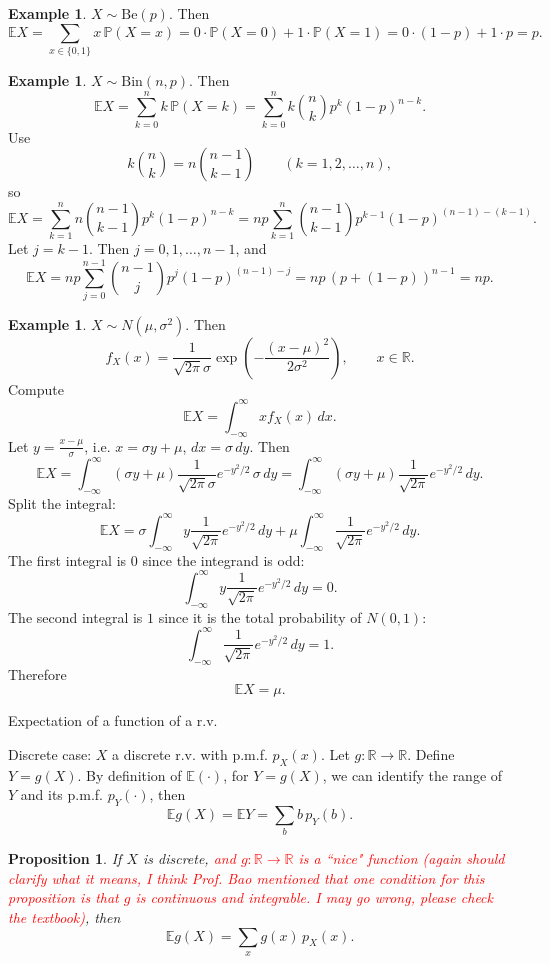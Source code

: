 \documentclass[11pt]{article}
\theoremstyle{plain}
\newtheorem{proposition}[theorem]{Proposition}
\theoremstyle{definition}
\newtheorem{example}[theorem]{Example}
\theoremstyle{remark}
\begin{document}
	\begin{example}
		\(X\sim \mathrm{Be}(p)\). Then
		\[
		\mathbb{E}X=\sum_{x\in\{0,1\}} x\,\mathbb{P}(X=x)
		=0\cdot\mathbb{P}(X=0)+1\cdot\mathbb{P}(X=1)
		=0\cdot(1-p)+1\cdot p
		=p.
		\]
	\end{example}
	
	\begin{example}
		\(X\sim \mathrm{Bin}(n,p)\). Then
		\[
		\mathbb{E}X=\sum_{k=0}^{n} k\,\mathbb{P}(X=k)
		=\sum_{k=0}^{n} k \binom{n}{k}p^k(1-p)^{n-k}.
		\]
		Use
		\[
		k\binom{n}{k}=n\binom{n-1}{k-1}\qquad (k=1,2,\dots,n),
		\]
		so
		\[
		\mathbb{E}X
		=\sum_{k=1}^{n} n\binom{n-1}{k-1}p^k(1-p)^{n-k}
		=np\sum_{k=1}^{n} \binom{n-1}{k-1}p^{k-1}(1-p)^{(n-1)-(k-1)}.
		\]
		Let \(j=k-1\). Then \(j=0,1,\dots,n-1\), and
		\[
		\mathbb{E}X
		=np\sum_{j=0}^{n-1} \binom{n-1}{j}p^{j}(1-p)^{(n-1)-j}
		=np\,(p+(1-p))^{n-1}
		=np.
		\]
	\end{example}
	
	\begin{example}
		\(X\sim N(\mu,\sigma^2)\). Then
		\[
		f_X(x)=\frac{1}{\sqrt{2\pi}\sigma}\exp\!\left(-\frac{(x-\mu)^2}{2\sigma^2}\right),
		\qquad x\in\mathbb{R}.
		\]
		Compute
		\[
		\mathbb{E}X=\int_{-\infty}^{\infty} x f_X(x)\,dx.
		\]
		Let \(y=\frac{x-\mu}{\sigma}\), i.e. \(x=\sigma y+\mu\), \(dx=\sigma\,dy\). Then
		\[
		\mathbb{E}X
		=\int_{-\infty}^{\infty} (\sigma y+\mu)\frac{1}{\sqrt{2\pi}\sigma}e^{-y^2/2}\,\sigma\,dy
		=\int_{-\infty}^{\infty} (\sigma y+\mu)\frac{1}{\sqrt{2\pi}}e^{-y^2/2}\,dy.
		\]
		Split the integral:
		\[
		\mathbb{E}X
		=\sigma\int_{-\infty}^{\infty} y\frac{1}{\sqrt{2\pi}}e^{-y^2/2}\,dy
		+\mu\int_{-\infty}^{\infty} \frac{1}{\sqrt{2\pi}}e^{-y^2/2}\,dy.
		\]
		The first integral is \(0\) since the integrand is odd:
		\[
		\int_{-\infty}^{\infty} y\frac{1}{\sqrt{2\pi}}e^{-y^2/2}\,dy=0.
		\]
		The second integral is \(1\) since it is the total probability of \(N(0,1)\):
		\[
		\int_{-\infty}^{\infty} \frac{1}{\sqrt{2\pi}}e^{-y^2/2}\,dy=1.
		\]
		Therefore
		\[
		\mathbb{E}X=\mu.
		\]
	\end{example}
	
	Expectation of a function of a r.v.
	
	Discrete case: \(X\) a discrete r.v. with p.m.f. \(p_X(x)\).
	Let \(g:\mathbb{R}\to\mathbb{R}\). Define \(Y=g(X)\).
	By definition of \(\mathbb{E}(\cdot)\), for \(Y=g(X)\), we can identify the range of \(Y\)
	and its p.m.f. \(p_Y(\cdot)\), then
	\[
	\mathbb{E}g(X)=\mathbb{E}Y=\sum_b b\,p_Y(b).
	\]
	
	\begin{proposition}
		If \(X\) is discrete, \textcolor{red}{and $g:\mathbb{R}\rightarrow\mathbb{R}$ is a ``nice" function (again should clarify what it means, I think Prof. Bao mentioned that one condition for this proposition is that $g$ is continuous and integrable. I may go wrong, please check the textbook)}, then
		\[
		\mathbb{E}g(X)=\sum_x g(x)\,p_X(x).
		\]
	\end{proposition}
	
\end{document}
